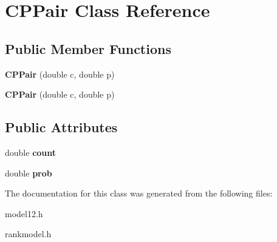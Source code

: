 \hypertarget{classCPPair}{\section{\-C\-P\-Pair \-Class \-Reference}
\label{classCPPair}
}
\subsection*{\-Public \-Member \-Functions}
\begin{DoxyCompactItemize}
\item 
\hypertarget{classCPPair_a5e1e1634748786a5d1ed74717242d5c5}{{\bfseries \-C\-P\-Pair} (double c, double p)}\label{classCPPair_a5e1e1634748786a5d1ed74717242d5c5}

\item 
\hypertarget{classCPPair_a5e1e1634748786a5d1ed74717242d5c5}{{\bfseries \-C\-P\-Pair} (double c, double p)}\label{classCPPair_a5e1e1634748786a5d1ed74717242d5c5}

\end{DoxyCompactItemize}
\subsection*{\-Public \-Attributes}
\begin{DoxyCompactItemize}
\item 
\hypertarget{classCPPair_a1614f767844def89437ae948db896884}{double {\bfseries count}}\label{classCPPair_a1614f767844def89437ae948db896884}

\item 
\hypertarget{classCPPair_aefe4cf2b8a4f34f5b8ee5cd0e916b5c7}{double {\bfseries prob}}\label{classCPPair_aefe4cf2b8a4f34f5b8ee5cd0e916b5c7}

\end{DoxyCompactItemize}


\-The documentation for this class was generated from the following files\-:\begin{DoxyCompactItemize}
\item 
model12.\-h\item 
rankmodel.\-h\end{DoxyCompactItemize}
